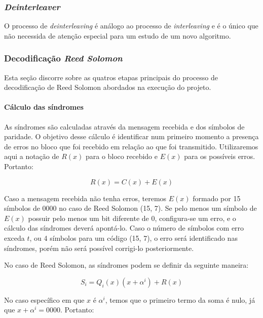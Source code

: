 	\subsubsection{\textit{Deinterleaver}}
	
	O processo de \textit{deinterleaving} é análogo ao processo de \textit{interleaving} e é o único que não necessida de atenção especial para um estudo de um novo algoritmo.
	
	\subsubsection{Decodificação \textit{Reed Solomon}}
	
	Esta seção discorre sobre as quatros etapas principais do processo de decodificação de Reed Solomon abordados na execução do projeto.
	
	\paragraph{Cálculo das síndromes}
	
	As síndromes são calculadas através da mensagem recebida e dos símbolos de paridade. O objetivo desse cálculo é identificar num primeiro momento a presença de erros no bloco que foi recebido em relação ao que foi transmitido. Utilizaremos aqui a notação de $R(x)$ para o bloco recebido e $E(x)$ para os possíveis erros. Portanto:
	
	\begin{equation}
	R(x) = C(x) + E(x)
	\end{equation}
	
	Caso a mensagem recebida não tenha erros, teremos $E(x)$ formado por 15 símbolos de 0000 no caso de Reed Solomon (15, 7). Se pelo menos um símbolo de $E(x)$ possuir pelo menos um bit diferente de 0, configura-se um erro, e o cálculo das síndromes deverá apontá-lo. Caso o número de símbolos com erro exceda $t$, ou 4 símbolos para um código (15, 7), o erro será identificado nas síndromes, porém não será possível corrigi-lo posteriormente.
	
	No caso de Reed Solomon, as síndromes podem se definir da seguinte maneira:
	
	\begin{equation}
	S_{i} = Q_{i}(x)(x + \alpha^{i}) + R(x)
	\end{equation}
	
	No caso específico em que $x$ é $\alpha^{i}$, temos que o primeiro termo da soma é nulo, já que $x + \alpha^{i} = 0000$. Portanto:
	
